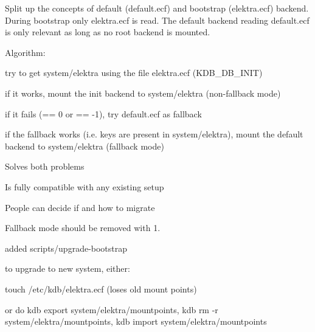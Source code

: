 Split up the concepts of default ({\ttfamily default.\+ecf}) and bootstrap ({\ttfamily elektra.\+ecf}) backend. During bootstrap only {\ttfamily elektra.\+ecf} is read. The default backend reading {\ttfamily default.\+ecf} is only relevant as long as no root backend is mounted.

Algorithm\+:


\begin{DoxyEnumerate}
\item try to get system/elektra using the file elektra.\+ecf (K\+D\+B\+\_\+\+D\+B\+\_\+\+I\+N\+IT)
\item if it works, mount the init backend to system/elektra (non-\/fallback mode)
\item if it fails (== 0 or == -\/1), try default.\+ecf as fallback
\item if the fallback works (i.\+e. keys are present in system/elektra), mount the default backend to system/elektra (fallback mode)
\end{DoxyEnumerate}


\begin{DoxyItemize}
\item Solves both problems
\item Is fully compatible with any existing setup
\item People can decide if and how to migrate
\end{DoxyItemize}


\begin{DoxyItemize}
\item Fallback mode should be removed with 1.
\item added scripts/upgrade-\/bootstrap
\end{DoxyItemize}

to upgrade to new system, either\+:


\begin{DoxyItemize}
\item touch /etc/kdb/elektra.ecf (loses old mount points)
\item or do kdb export system/elektra/mountpoints, kdb rm -\/r system/elektra/mountpoints, kdb import system/elektra/mountpoints 
\end{DoxyItemize}